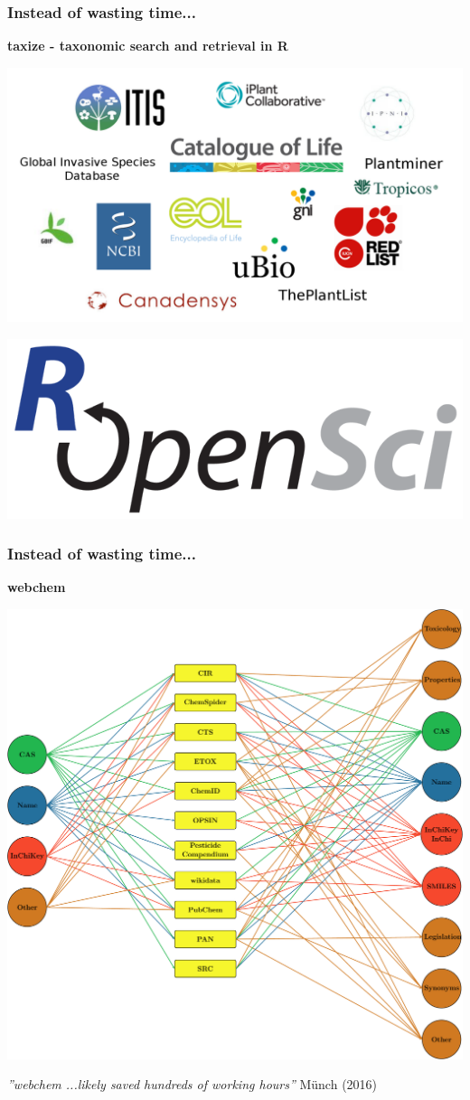 \documentclass[12pt
, t
]{beamer}
\begin{document}
\begin{frame}
\frametitle{Instead of wasting time...}
\textbf{\textcolor{hilight}{taxize - taxonomic search and retrieval in R}}
\begin{center}
\includegraphics[width =.8\textwidth]{fig/sources.png}
\end{center}
\vfill
\includegraphics{fig/ropensci2.png}
\end{frame}



\begin{frame}
\frametitle{Instead of wasting time...}
\textbf{\textcolor{hilight}{webchem}}
\begin{center}
\vspace*{-1.5cm}\includegraphics[width =.7\textwidth]{fig/fig1.pdf} \\
\end{center}
\pause
\emph{''webchem ...likely saved hundreds of working hours''}
\vfill
\hfill 
\tiny Münch (2016)
\end{frame}
\end{document}
